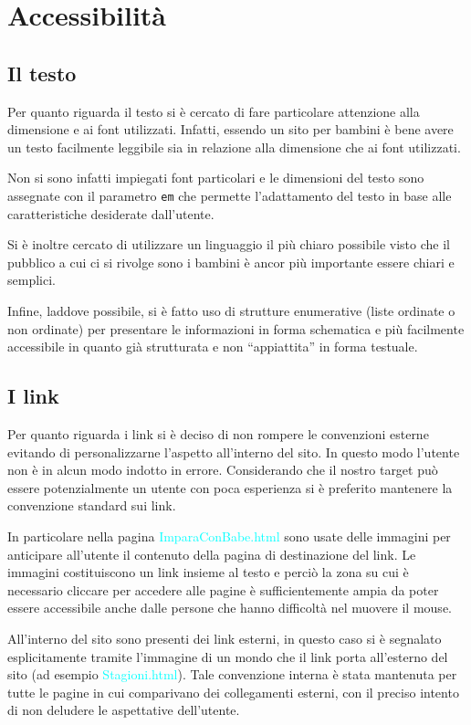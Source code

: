 \documentclass[10pt,a4paper,onecolumn]{article}
\newcommand{\sitepage}[1]{\textcolor{cyan}{\textsf{#1}}}
\begin{document}
\clearpage

\section{Accessibilità}\label{sec:accessibility}

\subsection{Il testo}\label{sec:testoaccessibile}
Per quanto riguarda il testo si è cercato di fare particolare attenzione alla dimensione e ai font utilizzati. Infatti, essendo un sito per bambini è bene avere un testo facilmente leggibile sia in relazione alla dimensione che ai font utilizzati.

Non si sono infatti impiegati font particolari e le dimensioni del testo sono assegnate con il parametro \texttt{em} che permette l'adattamento del testo in base alle caratteristiche desiderate dall'utente.  

Si è inoltre cercato di utilizzare un linguaggio il più chiaro possibile visto che il pubblico a cui ci si rivolge sono i bambini è ancor più importante essere chiari e semplici.

Infine, laddove possibile, si è fatto uso di strutture enumerative (liste ordinate o non ordinate) per presentare le informazioni in forma schematica e più facilmente accessibile in quanto già strutturata e non ``appiattita'' in forma testuale.

\subsection{I link}
Per quanto riguarda i link si è deciso di non rompere le convenzioni esterne evitando di personalizzarne l'aspetto all'interno del sito.
In questo modo l'utente non è in alcun modo indotto in errore. Considerando che il nostro target può essere potenzialmente un utente con poca esperienza si è preferito mantenere la convenzione standard sui link.

In particolare nella pagina \sitepage{ImparaConBabe.html} sono usate delle immagini per anticipare all'utente il contenuto della pagina di destinazione del link.
Le immagini costituiscono un link insieme al testo  e perciò la zona su cui è necessario cliccare per accedere alle pagine è sufficientemente ampia da poter essere accessibile anche dalle persone che hanno difficoltà nel muovere il mouse.

All'interno del sito sono presenti dei link esterni, in questo caso si è segnalato esplicitamente tramite l'immagine di un mondo che il link porta all'esterno del sito (ad esempio \sitepage{Stagioni.html}). Tale convenzione interna è stata mantenuta per tutte le pagine in cui comparivano dei collegamenti esterni, con il preciso intento di non deludere le aspettative dell'utente.
\end{document}
